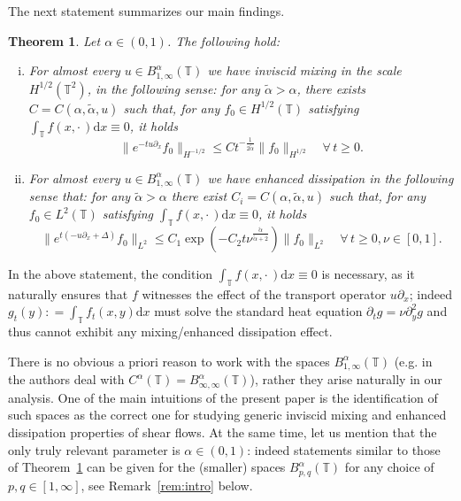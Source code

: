 \documentclass[11pt,oneside,reqno]{amsart}
\newcommand{\mathd}{\mathrm{d}}
\newenvironment{enumerateroman}{\begin{enumerate}[i.] }{\end{enumerate}}
\newtheorem{theorem}{Theorem}[section]
\numberwithin{equation}{section}
\begin{document}
The next statement summarizes our main findings.

\begin{theorem}
  \label{thm:main-thm-1}Let $\alpha \in (0, 1)$. The following hold:
  \begin{enumerateroman}
    \item For almost every $u \in B^{\alpha}_{1, \infty} (\mathbb{T})$ we have
    inviscid mixing in the scale $H^{1 / 2} (\mathbb{T}^2)$, in the following
    sense: for any $\tilde{\alpha} > \alpha$, there exists $C = C (\alpha,
    \tilde{\alpha}, u)$ such that, for any $f_0 \in H^{1 / 2} (\mathbb{T})$
    satisfying $\int_{\mathbb{T}} f \left( x, \cdot \, \right) \mathd x \equiv
    0$, it holds
    \[ \| e^{- t u \partial_x} f_0 \|_{H^{- 1 / 2}} \leqslant C t^{-
       \frac{1}{2 \tilde{\alpha}}}  \| f_0 \|_{H^{1 / 2}} \quad \forall \, t
       \geqslant 0. \]
    \item For almost every $u \in B^{\alpha}_{1, \infty} (\mathbb{T})$ we have
    enhanced dissipation in the following sense that: for any $\tilde{\alpha}
    > \alpha$ there exist $C_i = C (\alpha, \tilde{\alpha}, u)$ such that, for
    any $f_0 \in L^2 (\mathbb{T})$ satisfying $\int_{\mathbb{T}} f \left( x,
    \cdot \, \right) \mathd x \equiv 0$, it holds
    \[ \| e^{t (- u \partial_x + \Delta)} f_0 \|_{L^2} \leqslant C_1 \exp
       \left( - C_2 t \nu^{\frac{\tilde{\alpha}}{\tilde{\alpha} + 2}} \right)
       \| f_0 \|_{L^2} \quad \forall \, t \geqslant 0, \nu \in [0, 1] . \]
  \end{enumerateroman}
\end{theorem}

In the above statement, the condition $\int_{\mathbb{T}} f \left( x, \cdot \,
\right) \mathd x \equiv 0$ is necessary, as it naturally ensures that $f$
witnesses the effect of the transport operator $u \partial_x$; indeed $g_t (y)
: = \int_{\mathbb{T}} f_t (x, y) \mathd x$ must solve the standard heat
equation $\partial_t g = \nu \partial_y^2 g$ and thus cannot exhibit any
mixing/enhanced dissipation effect.

There is no obvious a priori reason to work with the spaces $B^{\alpha}_{1,
\infty} (\mathbb{T})$ (e.g. in~{\cite{colombozelati}} the authors deal with
$C^{\alpha} (\mathbb{T}) = B^{\alpha}_{\infty, \infty} (\mathbb{T})$), rather
they arise naturally in our analysis. One of the main intuitions of the
present paper is the identification of such spaces as the correct one for
studying generic inviscid mixing and enhanced dissipation properties of shear
flows. At the same time, let us mention that the only truly relevant parameter
is $\alpha \in (0, 1)$: indeed statements similar to those of
Theorem~\ref{thm:main-thm-1} can be given for the (smaller) spaces
$B^{\alpha}_{p, q} (\mathbb{T})$ for any choice of $p, q \in [1, \infty]$, see
Remark~\ref{rem:intro} below.
\end{document}

